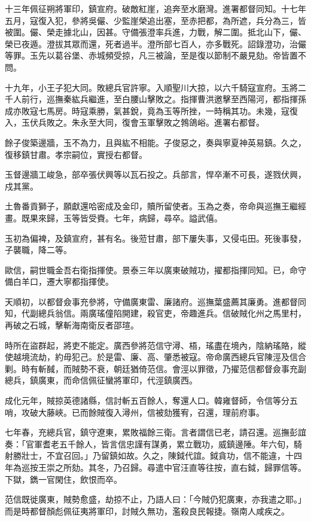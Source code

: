 \begin{pinyinscope}
十三年佩征朔將軍印，鎮宣府。破敵紅崖，追奔至水磨灣。進署都督同知。十七年五月，寇復入犯，參將吳儼、少監崖榮追出塞，至赤把都，為所遮，兵分為三，皆被圍。儼、榮走據北山，因甚。守備張澄率兵進，力戰，解二圍。抵北山下，儼、榮已夜遁。澄拔其眾而還，死者過半。澄所部七百人，亦多戰死。詔錄澄功，治儼等罪。玉先以葛谷堡、赤城頻受掠，凡三被論，至是復以節制不嚴見劾。帝皆置不問。

十九年，小王子犯大同。敗總兵官許寧。入順聖川大掠，以六千騎寇宣府。玉將二千人前行，巡撫秦紘兵繼進，至白腰山擊敗之。指揮曹洪邀擊至西陽河，都指揮孫成亦敗寇七馬房。時寇乘勝，氣甚銳，竟為玉等所挫，一時稱其功。未幾，寇復入，玉伏兵敗之。朱永至大同，復會玉軍擊敗之鵓鴿峪。進署右都督。

餘子俊築邊牆，玉不為力，且與紘不相能。子俊惡之，奏與寧夏神英易鎮。久之，復移鎮甘肅。孝宗嗣位，實授右都督。

玉督邊牆工峻急，部卒張伏興等以瓦石投之。兵部言，悍卒漸不可長，遂戮伏興，戍其黨。

土魯番貢獅子，願獻還哈密成及金印，贖所留使者。玉為之奏，帝命與巡撫王繼經畫。既果來歸，玉等皆受賚。七年，病歸，尋卒。謚武僖。

玉初為偏裨，及鎮宣府，甚有名。後蒞甘肅，部下屢失事，又侵屯田。死後事發，子襲職，降二等。

歐信，嗣世職金吾右衛指揮使。景泰三年以廣東破賊功，擢都指揮同知。已，命守備白羊口，遷大寧都指揮使。

天順初，以都督僉事充參將，守備廣東雷、廉諸府。巡撫葉盛薦其廉勇。進都督同知，代副總兵翁信。兩廣瑤僮陷開建，殺官吏，帝趣進兵。信破賊化州之馬里村，再破之石城，擊斬海南衛反者邵瑄。

時所在盜群起，將吏不能定。廣西參將范信守潯、梧，瑤盡在境內，陰納瑤賂，縱使越境流劫，約毋犯己。於是雷、廉、高、肇悉被寇。帝命廣西總兵官陳涇及信合剿。時有斬馘，而賊勢不衰，朝廷猶倚范信。會涇以罪徵，乃擢范信都督僉事充副總兵，鎮廣東，而命信佩征蠻將軍印，代涇鎮廣西。

成化元年，賊掠英德諸縣，信討斬五百餘人，奪還人口。韓雍督師，令信等分五哨，攻破大藤峽。已而餘賊復入潯州，信被劾獲宥，召還，理前府事。

七年春，充總兵官，鎮守遼東，累敗福餘三衛。言者謂信已老，請召還。巡撫彭誼奏：「官軍耆老五千餘人，皆言信忠謹有謀勇，累立戰功，威鎮邊陲。年六旬，騎射勝壯士，不宜召回。」乃留鎮如故。久之，陳鉞代誼。鉞貪功，信不能違，十四年為巡按王崇之所劾。其冬，乃召歸。尋遣中官汪直等往按，直右鉞，歸罪信等。下獄，鐫一官閑住，飲恨而卒。

范信既徙廣東，賊勢愈盛，劫掠不止，乃語人曰：「今賊仍犯廣東，亦我遣之耶。」而是時都督顏彪佩征夷將軍印，討賊久無功，濫殺良民報捷。嶺南人咸疾之。


\end{pinyinscope}
